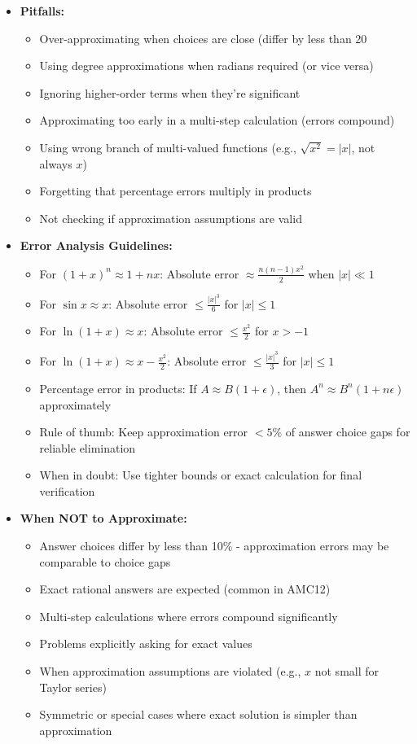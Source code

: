 \documentclass[12pt]{article}
\begin{document}
\begin{itemize}
    \item \textbf{Pitfalls:} 
    \begin{itemize}
        \item Over-approximating when choices are close (differ by less than 20%
        \item Using degree approximations when radians required (or vice versa)
        \item Ignoring higher-order terms when they're significant
        \item Approximating too early in a multi-step calculation (errors compound)
        \item Using wrong branch of multi-valued functions (e.g., $\sqrt{x^2} = |x|$, not always $x$)
        \item Forgetting that percentage errors multiply in products
        \item Not checking if approximation assumptions are valid
    \end{itemize}
    
    \item \textbf{Error Analysis Guidelines:}
    \begin{itemize}
        \item For $(1+x)^n \approx 1+nx$: Absolute error $\approx \frac{n(n-1)x^2}{2}$ when $|x| \ll 1$
        \item For $\sin x \approx x$: Absolute error $\leq \frac{|x|^3}{6}$ for $|x| \leq 1$
        \item For $\ln(1+x) \approx x$: Absolute error $\leq \frac{x^2}{2}$ for $x > -1$
        \item For $\ln(1+x) \approx x - \frac{x^2}{2}$: Absolute error $\leq \frac{|x|^3}{3}$ for $|x| \leq 1$
        \item Percentage error in products: If $A \approx B(1+\epsilon)$, then $A^n \approx B^n(1+n\epsilon)$ approximately
        \item Rule of thumb: Keep approximation error $< 5\%$ of answer choice gaps for reliable elimination
        \item When in doubt: Use tighter bounds or exact calculation for final verification
    \end{itemize}
    
    \item \textbf{When NOT to Approximate:}
    \begin{itemize}
        \item Answer choices differ by less than 10\% - approximation errors may be comparable to choice gaps
        \item Exact rational answers are expected (common in AMC12)
        \item Multi-step calculations where errors compound significantly
        \item Problems explicitly asking for exact values
        \item When approximation assumptions are violated (e.g., $x$ not small for Taylor series)
        \item Symmetric or special cases where exact solution is simpler than approximation
    \end{itemize}
    

\end{itemize}
\end{document}
